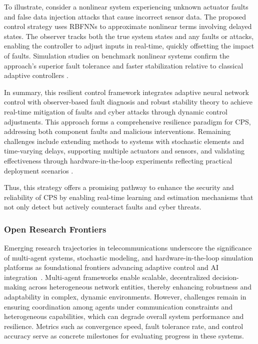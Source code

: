 \documentclass[sigconf]{acmart}
\begin{document}
To illustrate, consider a nonlinear system experiencing unknown actuator faults and false data injection attacks that cause incorrect sensor data. The proposed control strategy uses RBFNNs to approximate nonlinear terms involving delayed states. The observer tracks both the true system states and any faults or attacks, enabling the controller to adjust inputs in real-time, quickly offsetting the impact of faults. Simulation studies on benchmark nonlinear systems confirm the approach’s superior fault tolerance and faster stabilization relative to classical adaptive controllers \cite{ref46}.

In summary, this resilient control framework integrates adaptive neural network control with observer-based fault diagnosis and robust stability theory to achieve real-time mitigation of faults and cyber attacks through dynamic control adjustments. This approach forms a comprehensive resilience paradigm for CPS, addressing both component faults and malicious interventions. Remaining challenges include extending methods to systems with stochastic elements and time-varying delays, supporting multiple actuators and sensors, and validating effectiveness through hardware-in-the-loop experiments reflecting practical deployment scenarios \cite{ref46}.

Thus, this strategy offers a promising pathway to enhance the security and reliability of CPS by enabling real-time learning and estimation mechanisms that not only detect but actively counteract faults and cyber threats.

\subsubsection{Open Research Frontiers}

Emerging research trajectories in telecommunications underscore the significance of multi-agent systems, stochastic modeling, and hardware-in-the-loop simulation platforms as foundational frontiers advancing adaptive control and AI integration~\cite{ref46}. Multi-agent frameworks enable scalable, decentralized decision-making across heterogeneous network entities, thereby enhancing robustness and adaptability in complex, dynamic environments. However, challenges remain in ensuring coordination among agents under communication constraints and heterogeneous capabilities, which can degrade overall system performance and resilience. Metrics such as convergence speed, fault tolerance rate, and control accuracy serve as concrete milestones for evaluating progress in these systems.
\end{document}
